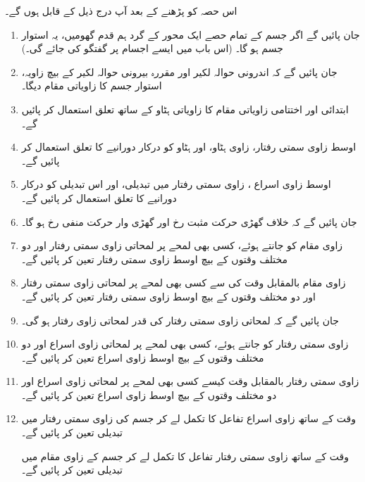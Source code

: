 اس حصہ کو پڑھنے کے بعد آپ درج ذیل کے قابل ہوں گے۔
\begin{enumerate}[1.]
\item
جان پائیں گے اگر جسم کے تمام حصے ایک  محور کے گرد  ہم قدم گھومیں، یہ   استوار  جسم ہو گا۔ (اس باب میں ایسے اجسام پر گفتگو کی جائے گی۔)
\item
جان پائیں گے کہ  اندرونی حوالہ لکیر اور مقررہ  بیرونی حوالہ لکیر  کے بیچ زاویہ،  استوار جسم کا زاویاتی مقام دیگا۔
\item
ابتدائی اور اختتامی زاویاتی مقام  کا زاویاتی ہٹاو کے ساتھ تعلق استعمال کر پائیں گے۔
\item
اوسط زاوی سمتی رفتار،  زاوی ہٹاو، اور ہٹاو کو درکار دورانیے کا  تعلق استعمال کر پائیں گے۔
\item
اوسط زاوی  اسراع ،  زاوی  سمتی رفتار میں تبدیلی، اور اس تبدیلی کو درکار دورانیے کا  تعلق استعمال کر پائیں گے۔
\item
جان پائیں گے کہ خلاف  گھڑی  حرکت مثبت  رخ اور گھڑی وار حرکت منفی  رخ ہو گا۔
\item
زاوی مقام   کو جانتے ہوئے، کسی بھی لمحے پر لمحاتی زاوی سمتی رفتار اور دو مختلف وقتوں کے بیچ اوسط زاوی سمتی رفتار تعین کر  پائیں گے۔
\item
زاوی مقام   بالمقابل   وقت   کی سے  کسی بھی لمحے پر لمحاتی زاوی سمتی رفتار اور دو مختلف وقتوں کے بیچ اوسط زاوی سمتی رفتار تعین کر  پائیں گے۔
\item
جان پائیں گے کہ لمحاتی زاوی  سمتی رفتار  کی قدر لمحاتی زاوی رفتار ہو گی۔
\item
زاوی  سمتی رفتار    کو   جانتے ہوئے، کسی بھی لمحے پر لمحاتی زاوی  اسراع اور دو مختلف وقتوں کے بیچ اوسط زاوی  اسراع تعین کر  پائیں گے۔
\item
زاوی سمتی رفتار    بالمقابل   وقت   کیسے  کسی بھی لمحے پر لمحاتی زاوی اسراع اور دو مختلف وقتوں کے بیچ اوسط زاوی اسراع تعین کر  پائیں گے۔
\item
وقت کے ساتھ زاوی اسراع تفاعل کا تکمل  لے کر جسم کی زاوی سمتی رفتار میں تبدیلی تعین کر پائیں گے۔

وقت کے ساتھ زاوی  سمتی رفتار  تفاعل کا تکمل  لے کر جسم کے  زاوی مقام میں تبدیلی تعین کر پائیں گے۔
\end{enumerate}

